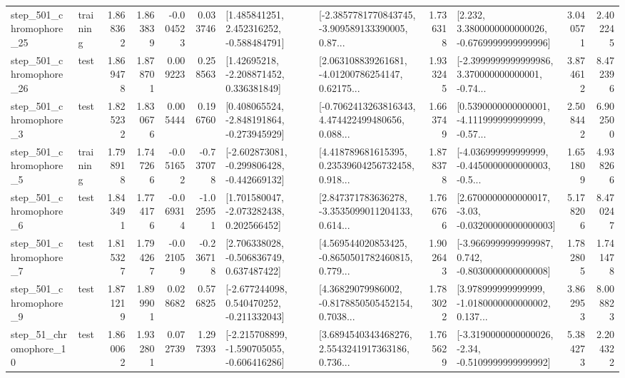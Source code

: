\begin{tabular}{llrrrrllrlrr}
  step\_501\_chromophore\_25 &  training &      1.868362 &    1.863839 &     -0.004523 &  0.033746 &    [1.485841251, 2.452316252, -0.588484791] &  [-2.3857781770843745, -3.909589133390005, 0.87... &       1.736318 &   [2.232, 3.3800000000000026, -0.6769999999999996] &            3.040571 &          2.402245 \\
  step\_501\_chromophore\_26 &      test &      1.869478 &    1.878701 &      0.009223 &  0.258563 &     [1.42695218, -2.208871452, 0.336381849] &  [2.063108839261681, -4.01200786254147, 0.62175... &       1.933245 &  [-2.3999999999999986, 3.370000000000001, -0.74... &            3.874612 &          8.472396 \\
   step\_501\_chromophore\_3 &      test &      1.825232 &    1.830676 &      0.005444 &  0.196760 &   [0.408065524, -2.848191864, -0.273945929] &  [-0.7062413263816343, 4.474422499480656, 0.088... &       1.663749 &  [0.5390000000000001, -4.111999999999999, -0.57... &            2.508442 &          6.902500 \\
   step\_501\_chromophore\_5 &  training &      1.798918 &    1.747266 &     -0.051652 & -0.737078 &  [-2.602873081, -0.299806428, -0.442669132] &  [4.418789681615395, 0.23539604256732458, 0.918... &       1.878378 &  [-4.036999999999999, -0.4450000000000003, -0.5... &            1.651809 &          4.938266 \\
   step\_501\_chromophore\_6 &      test &      1.843491 &    1.774176 &     -0.069314 & -1.025951 &    [1.701580047, -2.073282438, 0.202566452] &  [2.847371783636278, -3.3535099011204133, 0.614... &       1.766766 &  [2.6700000000000017, -3.03, -0.03200000000000003] &            5.178206 &          8.470247 \\
   step\_501\_chromophore\_7 &      test &      1.815327 &    1.794267 &     -0.021059 & -0.236718 &    [2.706338028, -0.506836749, 0.637487422] &  [4.569544020853425, -0.8650501782460815, 0.779... &       1.902643 &  [-3.9669999999999987, 0.742, -0.8030000000000008] &            1.782805 &          1.741478 \\
   step\_501\_chromophore\_9 &      test &      1.871219 &    1.899901 &      0.028682 &  0.576825 &   [-2.677244098, 0.540470252, -0.211332043] &  [4.36829079986002, -0.8178850505452154, 0.7038... &       1.783022 &  [3.978999999999999, -1.0180000000000002, 0.137... &            3.862953 &          8.008823 \\
   step\_51\_chromophore\_10 &      test &      1.860062 &    1.932801 &      0.072739 &  1.297393 &  [-2.215708899, -1.590705055, -0.606416286] &  [3.6894540343468276, 2.5543241917363186, 0.736... &       1.765629 &  [-3.3190000000000026, -2.34, -0.5109999999999992] &            5.384273 &          2.204322 \\

\end{tabular}
